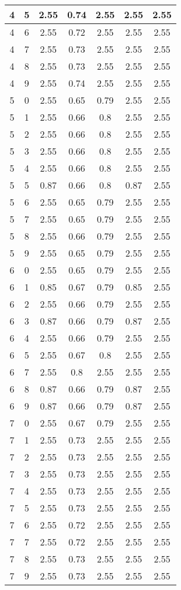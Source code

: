 \begin{longtable}{|c|c||c||c|c||c|c|}
	4 & 5 & 2.55 & 0.74 & 2.55 & 2.55 & 2.55 \\ \hline
	4 & 6 & 2.55 & 0.72 & 2.55 & 2.55 & 2.55 \\ \hline
	4 & 7 & 2.55 & 0.73 & 2.55 & 2.55 & 2.55 \\ \hline
	4 & 8 & 2.55 & 0.73 & 2.55 & 2.55 & 2.55 \\ \hline
	4 & 9 & 2.55 & 0.74 & 2.55 & 2.55 & 2.55 \\ \hline
	5 & 0 & 2.55 & 0.65 & 0.79 & 2.55 & 2.55 \\ \hline
	5 & 1 & 2.55 & 0.66 & 0.8 & 2.55 & 2.55 \\ \hline
	5 & 2 & 2.55 & 0.66 & 0.8 & 2.55 & 2.55 \\ \hline
	5 & 3 & 2.55 & 0.66 & 0.8 & 2.55 & 2.55 \\ \hline
	5 & 4 & 2.55 & 0.66 & 0.8 & 2.55 & 2.55 \\ \hline
	5 & 5 & 0.87 & 0.66 & 0.8 & 0.87 & 2.55 \\ \hline
	5 & 6 & 2.55 & 0.65 & 0.79 & 2.55 & 2.55 \\ \hline
	5 & 7 & 2.55 & 0.65 & 0.79 & 2.55 & 2.55 \\ \hline
	5 & 8 & 2.55 & 0.66 & 0.79 & 2.55 & 2.55 \\ \hline
	5 & 9 & 2.55 & 0.65 & 0.79 & 2.55 & 2.55 \\ \hline
	6 & 0 & 2.55 & 0.65 & 0.79 & 2.55 & 2.55 \\ \hline
	6 & 1 & 0.85 & 0.67 & 0.79 & 0.85 & 2.55 \\ \hline
	6 & 2 & 2.55 & 0.66 & 0.79 & 2.55 & 2.55 \\ \hline
	6 & 3 & 0.87 & 0.66 & 0.79 & 0.87 & 2.55 \\ \hline
	6 & 4 & 2.55 & 0.66 & 0.79 & 2.55 & 2.55 \\ \hline
	6 & 5 & 2.55 & 0.67 & 0.8 & 2.55 & 2.55 \\ \hline
	6 & 7 & 2.55 & 0.8 & 2.55 & 2.55 & 2.55 \\ \hline
	6 & 8 & 0.87 & 0.66 & 0.79 & 0.87 & 2.55 \\ \hline
	6 & 9 & 0.87 & 0.66 & 0.79 & 0.87 & 2.55 \\ \hline
	7 & 0 & 2.55 & 0.67 & 0.79 & 2.55 & 2.55 \\ \hline
	7 & 1 & 2.55 & 0.73 & 2.55 & 2.55 & 2.55 \\ \hline
	7 & 2 & 2.55 & 0.73 & 2.55 & 2.55 & 2.55 \\ \hline
	7 & 3 & 2.55 & 0.73 & 2.55 & 2.55 & 2.55 \\ \hline
	7 & 4 & 2.55 & 0.73 & 2.55 & 2.55 & 2.55 \\ \hline
	7 & 5 & 2.55 & 0.73 & 2.55 & 2.55 & 2.55 \\ \hline
	7 & 6 & 2.55 & 0.72 & 2.55 & 2.55 & 2.55 \\ \hline
	7 & 7 & 2.55 & 0.72 & 2.55 & 2.55 & 2.55 \\ \hline
	7 & 8 & 2.55 & 0.73 & 2.55 & 2.55 & 2.55 \\ \hline
	7 & 9 & 2.55 & 0.73 & 2.55 & 2.55 & 2.55 \\ \hline
\end{longtable}
